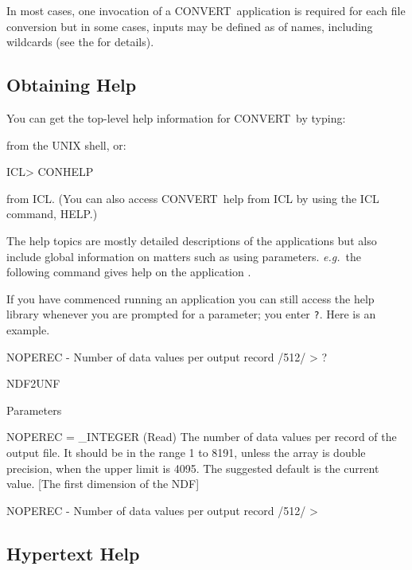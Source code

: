 \documentclass[twoside,11pt]{starlink}
\providecommand{\CONVERT}{{\footnotesize CONVERT}}
\begin{document}
In most cases, one invocation of a \CONVERT\ application is required for each
file conversion but in some cases, inputs may be defined as
 of names, including wildcards (see the
 for details).

\subsection{Obtaining Help}
You can get the top-level help information for \CONVERT\  by typing:


\begin{terminalv}
\end{terminalv}
from the UNIX shell, or:
\begin{terminalv}
     ICL> CONHELP
\end{terminalv}
from ICL. (You can also access \CONVERT\ help from ICL by using the ICL command,
HELP.)

The help topics are mostly detailed descriptions of the applications
but also include global information on matters such as using parameters.
\emph{e.g.}\ the following command gives help on the application
.


\begin{terminalv}
\end{terminalv}


If you have commenced running an application you can still access the
help library whenever you are prompted for a parameter; you enter \texttt{?}.
Here is an example.


\begin{terminalv}
     NOPEREC - Number of data values per output record /512/ > ?

     NDF2UNF

       Parameters

         NOPEREC = _INTEGER (Read)
            The number of data values per record of the output file.  It
            should be in the range 1 to 8191, unless the array is double
            precision, when the upper limit is 4095.  The suggested
            default is the current value. [The first dimension of the NDF]

     NOPEREC - Number of data values per output record /512/ >
\end{terminalv}

\subsection{Hypertext Help\label{se_hypertext}}
\end{document}
